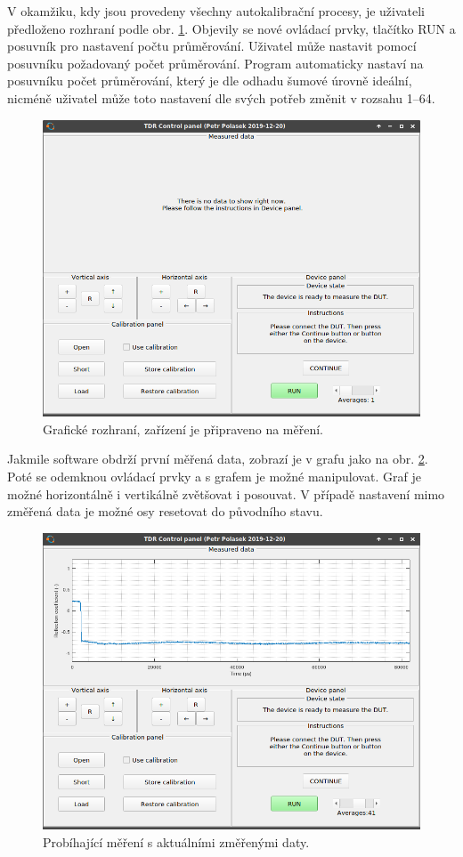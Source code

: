 V okamžiku, kdy jsou provedeny všechny autokalibrační procesy, je uživateli předloženo rozhraní podle obr. \ref{dut_ready}. Objevily se nové ovládací prvky, tlačítko RUN a posuvník pro nastavení počtu průměrování. Uživatel může nastavit pomocí posuvníku požadovaný počet průměrování. Program automaticky nastaví na posuvníku počet průměrování, který je dle odhadu šumové úrovně ideální, nicméně uživatel může toto nastavení dle svých potřeb změnit v rozsahu \SIrange{1}{64}{}. 
\begin{figure}[htbp]
\includegraphics[width=\textwidth,keepaspectratio]{images/gui/dut_ready.png}\caption{Grafické rozhraní, zařízení je připraveno na měření.}\label{dut_ready}
\end{figure}

Jakmile software obdrží první měřená data, zobrazí je v grafu jako na obr. \ref{measured_data}. Poté se odemknou ovládací prvky a s grafem je možné manipulovat. Graf je možné horizontálně i vertikálně zvětšovat i posouvat. V případě nastavení mimo změřená data je možné osy resetovat do původního stavu.
\begin{figure}[htbp]
\includegraphics[width=\textwidth,keepaspectratio]{images/gui/measured_data.png}\caption{Probíhající měření s aktuálními změřenými daty.}\label{measured_data}
\end{figure}

